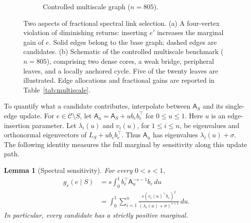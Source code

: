 \documentclass[conference]{IEEEtran}
\newtheorem{lemma}{Lemma}
\theoremstyle{definition}
\newcommand{\POLAR}{\textsc{POLAR}}
\newcommand{\matA}{\mathsf A}
\begin{document}
\begin{figure}[t]
\begin{subfigure}[t]{.50\textwidth}
\caption{Controlled multiscale graph ($n=805$).}
\end{subfigure}
\caption{Two aspects of fractional spectral link selection.
(a) A four-vertex violation of diminishing returns: inserting $e'$
increases the marginal gain of $e$. Solid edges belong to the base
graph; dashed edges are candidates. (b) Schematic of the controlled
multiscale benchmark ($n=805$), comprising two dense cores, a weak
bridge, peripheral leaves, and a locally anchored cycle. Five of
the twenty leaves are illustrated. Edge allocations and fractional
gains are reported in Table~\ref{tab:multiscale}.}
\label{fig:motivation}
\end{figure}
To quantify what a candidate contributes, interpolate between
$\matA_S$ and its single-edge update. For $e\in\mathcal C\setminus S$,
let $\matA_u=\matA_S+u b_eb_e^\top$ for $0\le u\le1$. Here $u$ is
an edge-insertion parameter. Let $\lambda_i(u)$ and $v_i(u)$,
for $1\le i\le n$, be eigenvalues and orthonormal eigenvectors
of $L_S+u b_eb_e^\top$. Thus $\matA_u$ has eigenvalues
$\lambda_i(u)+\sigma$. The following identity measures the
full marginal by sensitivity along this update path.
\begin{lemma}[Spectral sensitivity]
\label{lem:spectral-sensitivity}
For every $0<s<1$,
\begin{equation}
\begin{aligned}
g_s(e\mid S)
&=s\int_0^1 b_e^\top \matA_u^{-s-1}b_e\,du\\
&=\int_0^1\sum_{i=1}^n
\frac{s(v_i(u)^\top b_e)^2}{(\lambda_i(u)+\sigma)^{s+1}}\,du.
\end{aligned}
\label{eq:path-marginal}
\end{equation}
In particular, every candidate has a strictly positive marginal.
\end{lemma}
\end{document}
